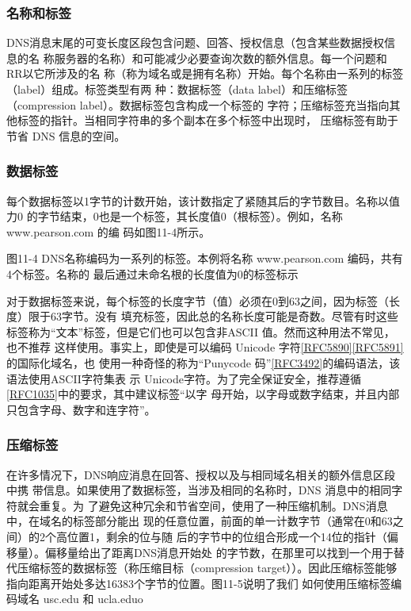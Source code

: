 \subsubsection{名称和标签}

DNS消息末尾的可变长度区段包含问题、回答、授权信息（包含某些数据授权信息的名
称服务器的名称）和可能减少必要查询次数的额外信息。每一个问题和 RR以它所涉及的名
称（称为域名或是拥有名称）开始。每个名称由一系列的标签（label）组成。标签类型有两
种：数据标签（data label）和压缩标签（compression label）。数据标签包含构成一个标签的
字符；压缩标签充当指向其他标签的指针。当相同字符串的多个副本在多个标签中出现时，
压缩标签有助于节省 DNS 信息的空间。

\subsubsection{数据标签}

每个数据标签以1字节的计数开始，该计数指定了紧随其后的字节数目。名称以值力0
的字节结束，0也是一个标签，其长度值0（根标签）。例如，名称www.pearson.com 的编
码如图11-4所示。

图11-4 DNS名称编码为一系列的标签。本例将名称
www.pearson.com 编码，共有4个标签。名称的
最后通过未命名根的长度值为0的标签标示

对于数据标签来说，每个标签的长度字节（值）必须在0到63之间，因为标签（长度）限于63字节。没有
填充标签，因此总的名称长度可能是奇数。尽管有时这些标签称为“文本”标签，但是它们也可以包含非ASCII
值。然而这种用法不常见，也不推荐
这样使用。事实上，即使是可以编码 Unicode
字符\href{https://www.rfc-editor.org/rfc/rfc5890}{[RFC5890]}\href{https://www.rfc-editor.org/rfc/rfc5891}{[RFC5891]}的国际化域名，也
使用一种奇怪的称为“Punycode
码”\href{https://www.rfc-editor.org/rfc/rfc3492}{[RFC3492]}的编码语法，该语法使用ASCII字符集表
示
Unicode字符。为了完全保证安全，推荐遵循\href{https://www.rfc-editor.org/rfc/rfc1035}{[RFC1035]}中的要求，其中建议标签“以字
母开始，以字母或数字结束，并且内部只包含字母、数字和连字符”。

\subsubsection{压缩标签}

在许多情况下，DNS响应消息在回答、授权以及与相同域名相关的额外信息区段中携
带信息。如果使用了数据标签，当涉及相同的名称时，DNS 消息中的相同字符就会重复。为
了避免这种冗余和节省空间，使用了一种压缩机制。DNS消息中，在域名的标签部分能出
现的任意位置，前面的单一计数字节（通常在0和63之间）的2个高位置1，剩余的位与随
后的字节中的位组合形成一个14位的指针（偏移量）。偏移量给出了距离DNS消息开始处
的字节数，在那里可以找到一个用于替代压缩标签的数据标签（称压缩目标（compression
target））。因此压缩标签能够指向距离开始处多达16383个字节的位置。图11-5说明了我们
如何使用压缩标签编码域名 usc.edu 和 ucla.eduo

